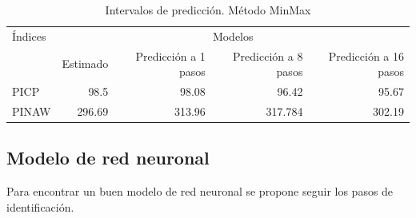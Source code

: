 \documentclass[12pt]{article}
\begin{document}
\begin{itemize}
\begin{table}[htbp]
  \centering
  \caption{Intervalos de predicción. Método MinMax}
    \begin{tabular}{|l|r|r|r|r|}
    \toprule
    Índices & \multicolumn{4}{c|}{Modelos} \\
\cmidrule{2-5}          & \multicolumn{1}{l|}{Estimado} & \multicolumn{1}{p{4.055em}|}{Predicción a 1 pasos} & \multicolumn{1}{p{4.055em}|}{Predicción a 8 pasos} & \multicolumn{1}{p{4.055em}|}{Predicción a 16 pasos} \\
    \midrule
    PICP  & 98.5  & 98.08 & 96.42 & 95.67 \\
    \midrule
    PINAW & 296.69 & 313.96 & 317.784 & 302.19 \\
    \bottomrule
    \end{tabular}%
  \label{tab:addlabel}%
\end{table}%


\end{itemize}


\newpage
\subsection{Modelo de red neuronal}

Para encontrar un buen modelo de red neuronal se propone seguir los pasos de identificación.
\end{document}
